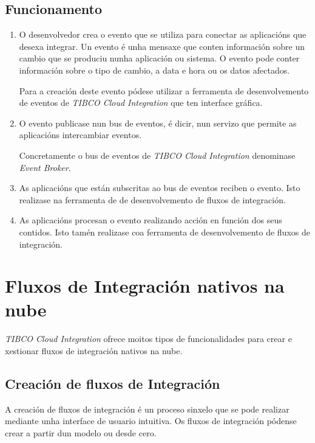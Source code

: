 \subsection{Funcionamento}

\begin{enumerate}
    \item O desenvolvedor crea o evento que se utiliza para conectar as aplicacións que desexa integrar. Un evento é unha mensaxe que conten información sobre un cambio que se produciu nunha aplicación ou sistema. O evento pode conter información sobre o tipo de cambio, a data e hora ou os datos afectados.
    
    Para a creación deste evento pódese utilizar a ferramenta de desenvolvemento de eventos de \textit{TIBCO Cloud Integration} que ten interface gráfica.
    
    \item O evento publicase nun bus de eventos, é dicir, nun servizo que permite as aplicacións intercambiar eventos.
    
    Concretamente o bus de eventos de \textit{TIBCO Cloud Integration} denominase \textit{Event Broker}.
    
    \item As aplicacións que están subscritas ao bus de eventos reciben o evento. Isto realizase na ferramenta de de desenvolvemento de fluxos de integración.
    
    \item As aplicacións procesan o evento realizando acción en función dos seus contidos. Isto tamén realizase coa ferramenta de desenvolvemento de fluxos de integración.
\end{enumerate}

\section{Fluxos de Integración nativos na nube}

\textit{TIBCO Cloud Integration} ofrece moitos tipos de funcionalidades para crear e xestionar fluxos de integración nativos na nube.

\subsection{Creación de fluxos de Integración}

A creación de fluxos de integración é un proceso sinxelo que se pode realizar mediante unha interface de usuario intuitiva. Os fluxos de integración pódense crear a partir dun modelo ou desde cero.

